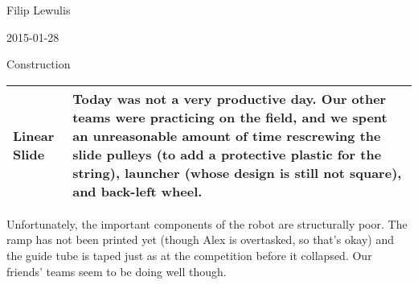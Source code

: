 Filip Lewulis

2015-01-28

Construction

\begin{tabular}{|p{5cm}|p{5cm}|}
\hline Linear Slide &
Today was not a very productive day. Our other teams were practicing on the field, and we spent an unreasonable amount of time rescrewing the slide pulleys (to add a protective plastic for the string), launcher (whose design is still not square), and back-left wheel.\\
\hline
\end{tabular}

Unfortunately, the important components of the robot are structurally poor. The ramp has not been printed yet (though Alex is overtasked, so that's okay) and the guide tube is taped just as at the competition before it collapsed. Our friends' teams seem to be doing well though.

